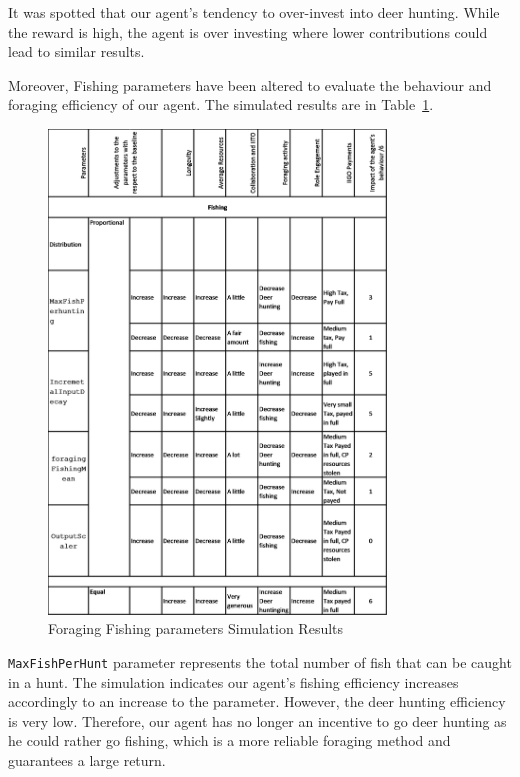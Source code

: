 It was spotted that our agent's tendency to over-invest into deer hunting. While the reward is high, the agent is over investing where lower contributions could lead to similar results.

Moreover, Fishing parameters have been altered to evaluate the behaviour and foraging efficiency of our agent. The simulated results are in Table~\ref{fig:Foraging Fishing parameters Simulation Results}.

\newpage 
\begin{figure}[!htb]
    \centering
    \includegraphics[width=0.8\textwidth]{13_team5_agentdesign/images/Foarging Simulation Fishing.png}
    \caption{Foraging Fishing parameters Simulation Results}
    \label{fig:Foraging Fishing parameters Simulation Results}
\end{figure}

\texttt{MaxFishPerHunt} parameter represents the total number of fish that can be caught in a hunt. The simulation indicates our agent's fishing efficiency increases accordingly to an increase to the parameter. However, the deer hunting efficiency is very low. Therefore, our agent has no longer an incentive to go deer hunting as he could rather go fishing, which is a more reliable foraging method and guarantees a large return.

